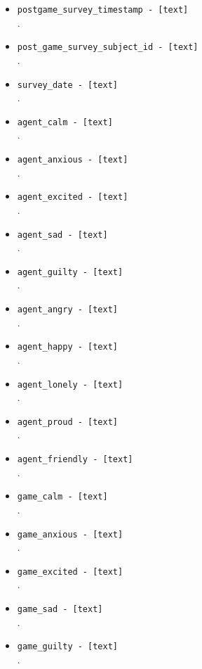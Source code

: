 \begin{description}
\begin{addmargin}[0em]{0em}
\begin{addmargin}[1em]{0em}
\begin{itemize}
            \item \verb|postgame_survey_timestamp - [text]|\\.
            \item \verb|post_game_survey_subject_id - [text]|\\.
            \item \verb|survey_date - [text]|\\.
            \item \verb|agent_calm - [text]|\\.
            \item \verb|agent_anxious - [text]|\\.
            \item \verb|agent_excited - [text]|\\.
            \item \verb|agent_sad - [text]|\\.
            \item \verb|agent_guilty - [text]|\\.
            \item \verb|agent_angry - [text]|\\.
            \item \verb|agent_happy - [text]|\\.
            \item \verb|agent_lonely - [text]|\\.
            \item \verb|agent_proud - [text]|\\.
            \item \verb|agent_friendly - [text]|\\.
            \item \verb|game_calm - [text]|\\.
            \item \verb|game_anxious - [text]|\\.
            \item \verb|game_excited - [text]|\\.
            \item \verb|game_sad - [text]|\\.
            \item \verb|game_guilty - [text]|\\.

\end{itemize}
\end{addmargin}
\end{addmargin}
\end{description}
